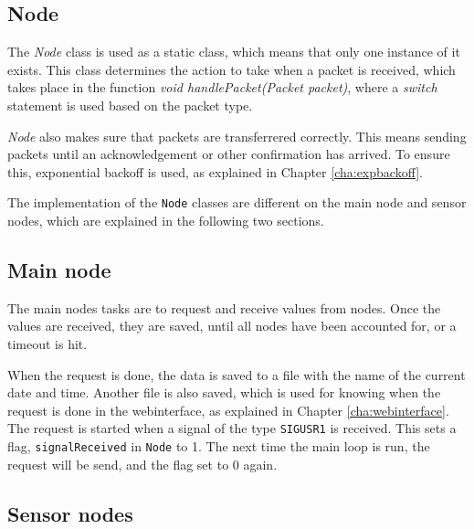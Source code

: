\subsection{Node}
The \textit{Node} class is used as a static class, which means that only one instance of it exists. This class determines the action to take when a packet is received, which takes place in the function \textit{void handlePacket(Packet packet)}, where a \textit{switch} statement is used based on the packet type.

\textit{Node} also makes sure that packets are transferrered correctly. This means sending packets until an acknowledgement or other confirmation has arrived. To ensure this, exponential backoff is used, as explained in Chapter \ref{cha:expbackoff}.

The implementation of the \texttt{Node} classes are different on the main node and sensor nodes, which are explained in the following two sections.

\subsection{Main node} \label{cha:signalhandling}
The main nodes tasks are to request and receive values from nodes. Once the values are received, they are saved, until all nodes have been accounted for, or a timeout is hit.

When the request is done, the data is saved to a file with the name of the current date and time. Another file is also saved, which is used for knowing when the request is done in the webinterface, as explained in Chapter \ref{cha:webinterface}. The request is started when a signal of the type \texttt{SIGUSR1} is received. This sets a flag, \texttt{signalReceived} in \texttt{Node} to 1. The next time the main loop is run, the request will be send, and the flag set to 0 again.

\subsection{Sensor nodes} 
